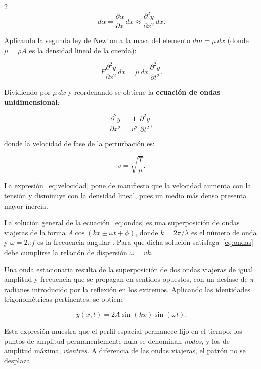 \documentclass[12pt,a4paper]{article}
\begin{document}
\begin{multicols}{2}
\begin{equation}
  d\alpha = \frac{\partial\alpha}{\partial x}\,dx \approx \frac{\partial^2 y}{\partial x^2}\,dx.
  \label{eq:dalpha}
\end{equation}

Aplicando la segunda ley de Newton a la masa del elemento $dm = \mu\,dx$ (donde $\mu = \rho A$ es la densidad lineal de la cuerda):

\begin{equation}
  F\frac{\partial^2 y}{\partial x^2}\,dx = \mu\,dx\,\frac{\partial^2 y}{\partial t^2}.
  \label{eq:newton}
\end{equation}

Dividiendo por $\mu\,dx$ y reordenando se obtiene la \textbf{ecuación de ondas unidimensional}:

\begin{equation}
  \frac{\partial^2 y}{\partial x^2} = \frac{1}{v^2}\,\frac{\partial^2 y}{\partial t^2},
  \label{eq:ondas}
\end{equation}

donde la velocidad de fase de la perturbación es:

\begin{equation}
  v = \sqrt{\frac{T}{\mu}}.
  \label{eq:velocidad}
\end{equation}

La expresión~\eqref{eq:velocidad} pone de manifiesto que la velocidad aumenta con la tensión y disminuye con la densidad lineal, pues un medio más denso presenta mayor inercia.

La solución general de la ecuación~\eqref{eq:ondas} es una superposición de ondas viajeras de la forma $A\cos(kx \pm \omega t + \phi)$, donde $k = 2\pi/\lambda$ es el número de onda y $\omega = 2\pi f$ es la frecuencia angular \cite{thornton2004}. Para que dicha solución satisfaga~\eqref{eq:ondas} debe cumplirse la relación de dispersión $\omega = vk$.

Una onda estacionaria resulta de la superposición de dos ondas viajeras de igual amplitud y frecuencia que se propagan en sentidos opuestos, con un desfase de $\pi$ radianes introducido por la reflexión en los extremos. Aplicando las identidades trigonométricas pertinentes, se obtiene

\begin{equation}
  y(x,t) = 2A\sin(kx)\sin(\omega t).
  \label{eq:estacionaria}
\end{equation}

Esta expresión muestra que el perfil espacial permanece fijo en el tiempo: los puntos de amplitud permanentemente nula se denominan \textit{nodos}, y los de amplitud máxima, \textit{vientres}. A diferencia de las ondas viajeras, el patrón no se desplaza.


\end{multicols}
\end{document}
